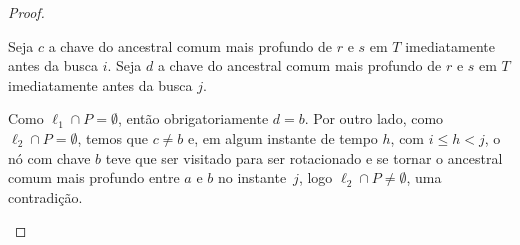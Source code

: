 \begin{proof}
    \begin{center}
    \begin{minipage}[t]{0.6\textwidth}
        Seja $c$ a chave do ancestral comum mais profundo de $r$ e $s$ em $T$ imediatamente antes da busca $i$. Seja $d$ a chave do ancestral comum mais profundo de $r$ e $s$ em $T$ imediatamente antes da busca $j$.
        
        Como $\ell_1 \cap P = \emptyset$, então obrigatoriamente $d = b$. Por outro lado, como $\ell_2 \cap P = \emptyset$, temos que $c \neq b$ e, em algum instante de tempo $h$, com $i \leq h < j$, o nó com chave $b$ teve que ser visitado para ser rotacionado e se tornar o ancestral comum mais profundo entre $a$ e $b$ no instante~$j$, logo $\ell_2 \cap P \neq \emptyset$, uma contradição.
    \end{minipage}\hfill
    \begin{minipage}[t]{0.4\textwidth}
        \centering
        \vspace{-0.65cm}
        \begin{figure}[H]
            \centering
            \begin{adjustbox}{valign=t}
\end{adjustbox}
\end{figure}
\end{minipage}
\end{center}
\end{proof}
